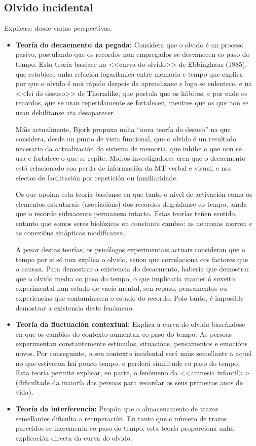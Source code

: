 \documentclass[a4paper,11pt]{article}
\begin{document}
\subsection{Olvido incidental}
Explícase desde varias perspectivas:
\begin{itemize}
	\item \textbf{Teoría do decaemento da pegada:} Considera que o olvido é un proceso pasivo, 
	postulando que os recordos non empregados se desvanecen co paso do tempo. Esta teoría baséase na 
	<<curva do olvido>> de Ebbinghaus (1885), que establece unha relación logarítmica entre memoria 
	e tempo que explica por que o olvido é moi rápido despois da aprendizaxe e logo se enlentece, e 
	na <<lei do desuso>> de Thorndike, que postula que os hábitos, e por ende os recordos, que se 
	usan repetidamente se fortalecen, mentres que os que non se usan debilítanse ata desaparecer. 
	
	Máis actualmente, Bjork propuxo unha ``nova teoría do desuso'' na que considera, desde un punto 
	de vista funcional, que o olvido é un resultado necesario da actualización do sistema de 
	memoria, que inhibe o que non se usa e fortalece o que se repite. Moitos investigadores cren que 
	o decaemento está relacionado coa perda de información da MT verbal e visual, e nos efectos de 
	facilitación por repetición ou familiaridade.
	
	Os que apoian esta teoría baséanse en que tanto o nivel de activación coma os elementos 
	estruturais (asociacións) dos recordos degrádanse co tempo, aínda que o recordo subxacente 
	permaneza intacto. Estas teorías teñen sentido, entanto que somos seres biolóxicos en constante 
	cambio: as neuronas morren e as conexións sinápticas modifícanse.
	
	A pesar destas teorías, os psicólogos experimentais actuais consideran que o tempo por si só non 
	explica o olvido, senon que correlaciona cos factores que o causan. Para demostrar a existencia 
	do decaemento, habería que demostrar que o olvido medra co paso do tempo, o que implicaría 
	manter ó suxeito experimental nun estado de vacío mental, sen repaso, pensamentos ou 
	experiencias que contaminasen o estado do recordo. Polo tanto, é imposible demostrar a 
	existencia deste fenómeno.
	\item \textbf{Teoría da fluctuación contextual:} Explica a curva do olvido baseándose en que os 
	cambios do contexto aumentan co paso do tempo. As persoas experimentan constantemente estímulos, 
	situacións, pensamentos e emocións novos. Por conseguinte, o seu contexto incidental será máis 
	semellante a aquel no que estiveron hai pouco tempo, e perderá similitude co paso do tempo. Esta 
	teoría permite explicar, en parte, o fenómeno da <<amnesia infantil>> (dificultade da maioría 
	das persoas para recordar os seus primeiros anos de vida).
	\item \textbf{Teoría da interferencia:} Propón que o almacenamento de trazos semellantes 
	dificulta a recuperación. En tanto que o número de trazos parecidos se incrementa co paso do 
	tempo, esta teoría proporciona unha explicación directa da curva do olvido. 
	

\end{itemize}
\end{document}
